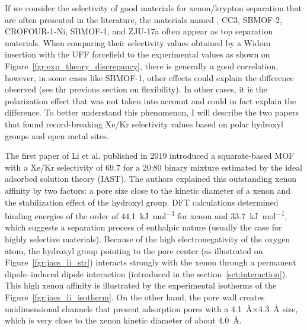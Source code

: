 \documentclass[main]{subfiles}
\begin{document}
If we consider the selectivity of good materials for xenon/krypton separation that are often presented in the literature, the materials named ,\autocite{Wang_2014} CC3,\autocite{Chen_2014} SBMOF-2,\autocite{Chen_2015} CROFOUR-1-Ni,\autocite{Mohamed_2016}  SBMOF-1,\autocite{Banerjee_2016} \autocite{Li_2019} and ZJU-17a\autocite{Pei_2022} often appear as top separation materials.
When comparing their selectivity values obtained by a Widom insertion with the UFF forcefield to the experimental values as shown on Figure~\ref{fgr:exp_theory_discrepancy}, there is generally a good correlation, however, in some cases like SBMOF-1, other effects could explain the difference observed (see thr previous section on flexibility). In other cases, it is the polarization effect that was not taken into account and could in fact explain the difference. To better understand this phenomenon, I will describe the two papers that found record-breaking Xe/Kr selectivity values based on polar hydroxyl groups and open metal sites.

The first paper of Li et al.\autocite{Li_2019} published in 2019 introduced a squarate-based MOF with a Xe/Kr selectivity of $69.7$ for a 20:80 binary mixture estimated by the ideal adsorbed solution theory (IAST)\autocite{Cessford_2012}. The authors explained this outstanding xenon affinity by two factors: a pore size close to the kinetic diameter of a xenon and the stabilization effect of the hydroxyl group. DFT calculations determined binding energies of the order of \SI{44.1}{\kJ\per\mole} for xenon and \SI{33.7}{\kJ\per\mole}, which suggests a separation process of enthalpic nature (usually the case for highly selective materials). Because of the high electronegativity of the oxygen atom, the hydroxyl group pointing to the pore center (as illustrated on Figure~\ref{fgr:jacs_li_str}) interacts strongly with the xenon through a permanent dipole--induced dipole interaction (introduced in the section~\ref{sct:interaction}). This high xenon affinity is illustrated by the experimental isotherms of the Figure~\ref{fgr:jacs_li_isotherm}. On the other hand, the pore wall creates unidimensional channels that present adsorption pores with a \SI{4.1}{\angstrom}$\times$\SI{4.3}{\angstrom} size, which is very close to the xenon kinetic diameter of about \SI{4.0}{\angstrom}. 
\end{document}
